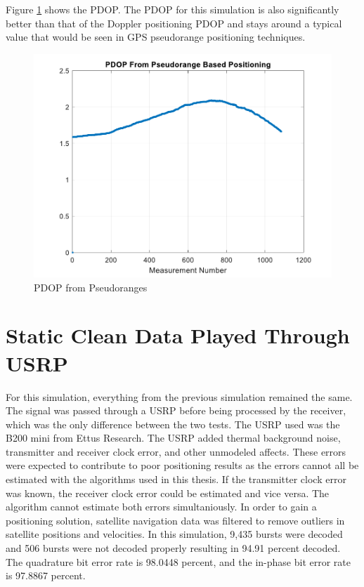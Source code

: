 \documentclass[12pt]{report}
\begin{document}
Figure \ref{fig:CleanPseudo15minIridPositPDOP} shows the PDOP. The PDOP for this simulation is also significantly better than that of the Doppler positioning PDOP and stays around a typical value that would be seen in GPS pseudorange positioning techniques.   
\begin{figure}[h!]
    \centering
    \includegraphics[width=5in]
    {15min_irid_clean_pseudorange_pdop.pdf}
    \caption{PDOP from Pseudoranges}
    \label{fig:CleanPseudo15minIridPositPDOP}
\end{figure}

\section{Static Clean Data Played Through USRP}
For this simulation, everything from the previous simulation remained the same. The signal was passed through a USRP before being processed by the receiver, which was the only difference between the two tests. The USRP used was the B200 mini from Ettus Research. The USRP added thermal background noise, transmitter and receiver clock error, and other unmodeled affects. These errors were expected to contribute to poor positioning results as the errors cannot all be estimated with the algorithms used in this thesis. If the transmitter clock error was known, the receiver clock error could be estimated and vice versa. The algorithm cannot estimate both errors simultaniously. In order to gain a positioning solution, satellite navigation data was filtered to remove outliers in satellite positions and velocities. In this simulation, 9,435 bursts were decoded and 506 bursts were not decoded properly resulting in 94.91 percent decoded. The quadrature bit error rate is 98.0448 percent, and the in-phase bit error rate is 97.8867 percent.
\end{document}
